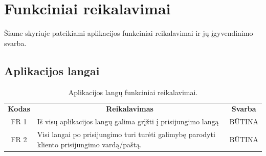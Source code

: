\documentclass{VUMIFPSkursinis}
\begin{document}
\section{Funkciniai reikalavimai}

Šiame skyriuje pateikiami aplikacijos funkciniai reikalavimai ir jų įgyvendinimo svarba.

\subsection{Aplikacijos langai}

\begin{center}
	\begin{table}[H]
	\caption{Aplikacijos langų funkciniai reikalavimai.}
	\begin{tabular}{|p{2cm}|p{}|p{}|}
	\hline
	    \rowcolor{lightgray}
		\multicolumn{3}{|c|}{Aplikacijos langai}\\
		
	\hline
		\multicolumn{1}{|c|}{{\bfseries Kodas}}&
		\multicolumn{1}{|c|}{{\bfseries Reikalavimas}}&
		\multicolumn{1}{|c|}{{\bfseries Svarba}}\\

	\hline
		\multicolumn{1}{|c|}{FR 1} &
		Iš visų aplikacijos langų galima grįžti į prisijungimo langą &
		\multicolumn{1}{|c|}{BŪTINA}\\
	\hline
		\multicolumn{1}{|c|}{FR 2} &
		{Visi langai po prisijungimo turi turėti galimybę parodyti kliento \newline prisijungimo vardą/paštą.}&
		\multicolumn{1}{|c|}{BŪTINA}\\
	\hline
	

\end{tabular}
\end{table}
\end{center}
\end{document}

